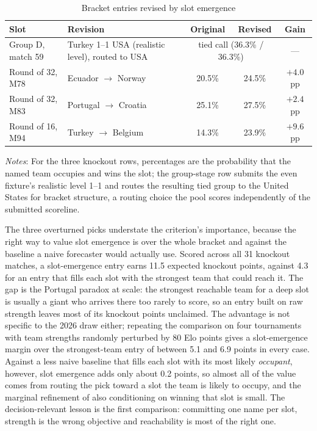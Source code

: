 \documentclass[11pt,letterpaper]{article}
\begin{document}
\begin{table}[!t]
  \centering
  \caption{Bracket entries revised by slot emergence}\label{tab:revisions}
  \begin{footnotesize}
  \begin{threeparttable}
    {\begin{tabular*}{\textwidth}{@{\extracolsep{\fill}} llccc}
      \toprule
      Slot & Revision & Original & Revised & Gain \\
      \midrule
      Group D, match 59 & Turkey 1--1 USA (realistic level), routed to USA & \multicolumn{2}{c}{tied call (36.3\% / 36.3\%)} & --- \\
      Round of 32, M78 & Ecuador $\to$ Norway & 20.5\% & 24.5\% & $+4.0$ pp \\
      Round of 32, M83 & Portugal $\to$ Croatia & 25.1\% & 27.5\% & $+2.4$ pp \\
      Round of 16, M94 & Turkey $\to$ Belgium & 14.3\% & 23.9\% & $+9.6$ pp \\
      \bottomrule
    \end{tabular*}}
    \begin{tablenotes}\notesize
      \item \textit{Notes}: For the three knockout rows, percentages are the probability that the named team occupies and wins the slot; the group-stage row submits the even fixture's realistic level 1--1 and routes the resulting tied group to the United States for bracket structure, a routing choice the pool scores independently of the submitted scoreline.
    \end{tablenotes}
  \end{threeparttable}
  \end{footnotesize}
\end{table}

The three overturned picks understate the criterion's importance, because the right way to value slot emergence is over the whole bracket and against the baseline a naive forecaster would actually use. Scored across all 31 knockout matches, a slot-emergence entry earns 11.5 expected knockout points, against 4.3 for an entry that fills each slot with the strongest team that could reach it. The gap is the Portugal paradox at scale: the strongest reachable team for a deep slot is usually a giant who arrives there too rarely to score, so an entry built on raw strength leaves most of its knockout points unclaimed. The advantage is not specific to the 2026 draw either; repeating the comparison on four tournaments with team strengths randomly perturbed by 80 Elo points gives a slot-emergence margin over the strongest-team entry of between 5.1 and 6.9 points in every case. Against a less naive baseline that fills each slot with its most likely \emph{occupant}, however, slot emergence adds only about 0.2 points, so almost all of the value comes from routing the pick toward a slot the team is likely to occupy, and the marginal refinement of also conditioning on winning that slot is small. The decision-relevant lesson is the first comparison: committing one name per slot, strength is the wrong objective and reachability is most of the right one.
\end{document}
